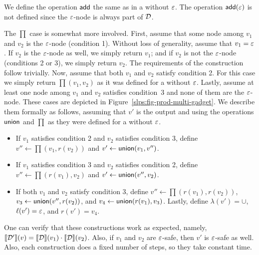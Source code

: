 	We define the operation $\mathsf{add}$ the same as in a \dsabbr without $\varepsilon$. The operation $\mathsf{add}(\varepsilon)$ is not defined since the $\varepsilon$-node is always part of $\mathcal{D}$.
	
	The $\prod$ case is somewhat more involved. First, assume that some node among $v_1$ and $v_2$ is the $\varepsilon$-node (condition 1). Without loss of generality, assume that $v_1 = \varepsilon$ . If $v_2$ is the $\varepsilon$-node as well, we simply return $v_1$; and if $v_2$ is not the $\varepsilon$-node (conditions 2 or 3), we simply return $v_2$. The requirements of the construction follow trivially. Now, assume that both $v_1$ and $v_2$ satisfy condition 2. For this case we simply return $\prod(v_1, v_2)$ as it was defined for a \dsabbr without $\varepsilon$. Lastly, assume at least one node among $v_1$ and $v_2$ satisfies condition~3 and none of them are the $\varepsilon$-node. These cases are depicted in Figure~\ref{slps:fig-prod-multi-gadget}. 
	We describe them formally as follows, assuming that $v'$ is the output and using the operations $\mathsf{union}$ and $\prod$ as they were defined for a \dsabbr without $\varepsilon$.
	\begin{itemize}
		\item If $v_1$ satisfies condition 2 and $v_2$ satisfies condition 3, define $v'' \gets \prod( v_1, r(v_2))$ and $v' \gets \mathsf{union}( v_1, v'')$.
		\item If $v_1$ satisfies condition 3 and $v_2$ satisfies condition 2, define $v'' \gets \prod( r(v_1), v_2)$ and $v' \gets \mathsf{union}( v'', v_2)$.
		\item If both $v_1$ and $v_2$ satisfy condition 3, define $v'' \gets \prod( r(v_1), r(v_2))$, $v_3 \gets \mathsf{union}( v'', r(v_2))$, and $v_4 \gets \mathsf{union}( r(v_1), v_3)$. Lastly, define $\lambda(v') = \cup$, $\ell(v') = \varepsilon$, and $r(v') = v_4$.
	\end{itemize}
	
	One can verify that these constructions work as expected, namely, ${\llbracket{\mathcal{D}'}\rrbracket}(v) = {\llbracket{\mathcal{D}}\rrbracket}(v_1)\cdot{\llbracket{\mathcal{D}}\rrbracket}(v_2)$. Also, if $v_1$ and $v_2$ are $\varepsilon$-safe, then $v'$ is $\varepsilon$-safe as well. Also, each construction does a fixed number of steps, so they take constant time.
	

